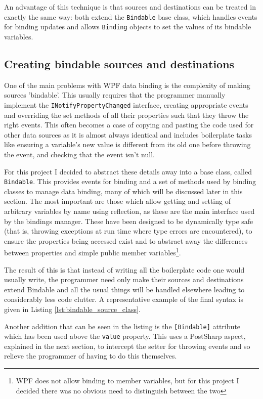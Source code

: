 \documentclass[12pt,twoside,notitlepage]{report}
\begin{document}
An advantage of this technique is that sources and destinations can be treated in exactly the same way: both extend the \texttt{Bindable} base class, which handles events for binding updates and allows \texttt{Binding} objects to set the values of its bindable variables.

\subsection{Creating bindable sources and destinations}

One of the main problems with WPF data binding is the complexity of making sources 'bindable'. This usually requires that the programmer manually implement the \texttt{INotifyPropertyChanged} interface, creating appropriate events and overriding the set methods of all their properties such that they throw the right events. This often becomes a case of copying and pasting the code used for other data sources as it is almost always identical and includes boilerplate tasks like ensuring a variable's new value is different from its old one before throwing the event, and checking that the event isn't null.

For this project I decided to abstract these details away into a base class, called \texttt{Bindable}. This provides events for binding and a set of methods used by binding classes to manage data binding, many of which will be discussed later in this section. The most important are those which allow getting and setting of arbitrary variables by name using reflection, as these are the main interface used by the bindings manager. These have been designed to be dynamically type safe (that is, throwing exceptions at run time where type errors are encountered), to ensure the properties being accessed exist and to abstract away the differences between properties and simple public member variables\footnote{WPF does not allow binding to member variables, but for this project I decided there was no obvious need to distinguish between the two}.

The result of this is that instead of writing all the boilerplate code one would usually write, the programmer need only make their sources and destinations extend Bindable and all the usual things will be handled elsewhere leading to considerably less code clutter. A representative example of the final syntax is given in Listing \ref{lst:bindable_source_class}.

Another addition that can be seen in the listing is the \texttt{[Bindable]} attribute which has been used above the \texttt{value} property. This uses a PostSharp aspect, explained in the next section, to intercept the setter for throwing events and so relieve the programmer of having to do this themselves.
\end{document}
